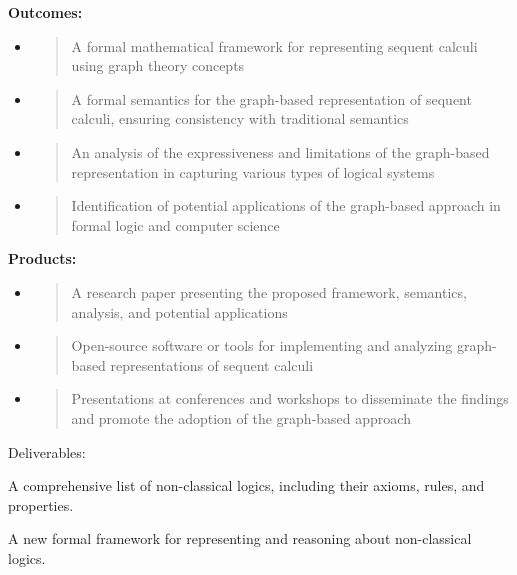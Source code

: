 \textbf{Outcomes:}

\begin{itemize}
\item
  \begin{quote}
  A formal mathematical framework for representing sequent calculi using
  graph theory concepts
  \end{quote}
\item
  \begin{quote}
  A formal semantics for the graph-based representation of sequent
  calculi, ensuring consistency with traditional semantics
  \end{quote}
\item
  \begin{quote}
  An analysis of the expressiveness and limitations of the graph-based
  representation in capturing various types of logical systems
  \end{quote}
\item
  \begin{quote}
  Identification of potential applications of the graph-based approach
  in formal logic and computer science
  \end{quote}
\end{itemize}

\textbf{Products:}

\begin{itemize}
\item
  \begin{quote}
  A research paper presenting the proposed framework, semantics,
  analysis, and potential applications
  \end{quote}
\item
  \begin{quote}
  Open-source software or tools for implementing and analyzing
  graph-based representations of sequent calculi
  \end{quote}
\item
  \begin{quote}
  Presentations at conferences and workshops to disseminate the findings
  and promote the adoption of the graph-based approach
  \end{quote}
\end{itemize}

Deliverables:

A comprehensive list of non-classical logics, including their axioms,
rules, and properties.

A new formal framework for representing and reasoning about
non-classical logics.

